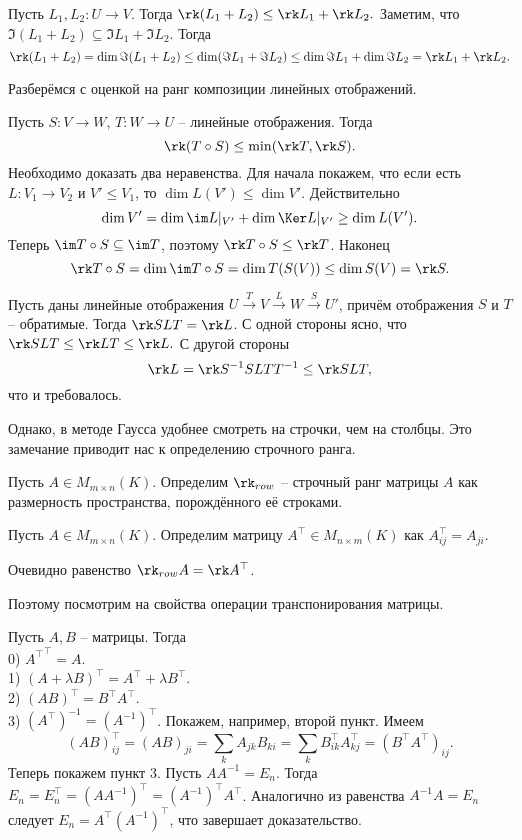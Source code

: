 \utv Пусть $L_1, L_2 \colon U \to V$. Тогда $\rk (L_1 + L_2) \leq \rk L_1 + \rk L_2.$
\eutv
\proof Заметим, что $\Im(L_1 + L_2) \subseteq \Im L_1 + \Im L_2$. Тогда 
$$\rk (L_1 + L_2) =\dim \Im(L_1 + L_2) \leq \dim(\Im L_1 + \Im L_2) \leq \dim\Im L_1 + \dim\Im L_2 = \rk L_1 + \rk L_2.$$
\endproof

Разберёмся с оценкой на ранг композиции линейных отображений.

\utv Пусть $S \colon V \to W$, $T \colon W \to U$ -- линейные отображения. Тогда
$$\rk (T \circ S) \leq \min(\rk T, \rk S).$$
\eutv 
Необходимо доказать два неравенства. Для начала покажем, что если есть $L\colon V_1 \to V_2$ и $V' \leq V_1$, то $\dim L(V') \leq \dim V'$. Действительно $$\dim V'= \dim \im L|_{V'} + \dim \Ker L|_{V'} \geq \dim L(V').$$
Теперь $\im T \circ S \subseteq  \im T$, поэтому $\rk T \circ S \leq \rk T$.
Наконец $$\rk T \circ S= \dim \im T \circ S = \dim T (S(V)) \leq \dim S(V)= \rk S.$$
\endproof


\crl Пусть даны линейные отображения $U \stackrel{T}{\to} V \stackrel{L}{\to} W \stackrel{S}{\to} U'$, причём отображения $S$ и $T$ -- обратимые. Тогда $\rk SLT=\rk L$.
\ecrl
\proof С одной стороны ясно, что $\rk SLT \leq \rk LT \leq \rk L.$ С другой стороны $$\rk L = \rk S^{-1}SLTT^{-1} \leq \rk SLT,$$ что и требовалось.
\endproof







Однако, в методе Гаусса удобнее смотреть на строчки, чем на столбцы. Это замечание приводит нас к определению строчного ранга.

\dfn Пусть $A\in M_{m\times n}(K)$. Определим $\rk_{row}$ -- строчный ранг матрицы $A$ как размерность пространства, порождённого её строками.
\edfn

\dfn Пусть  $A\in M_{m\times n}(K)$. Определим матрицу $A^{\top}\in M_{n\times m}(K)$ как $A^{\top}_{ij}=A_{ji}$.
\edfn

\rm Очевидно равенство $\rk_{row} A= \rk A^{\top}$.
\erm

Поэтому посмотрим на свойства операции транспонирования матрицы.

\lm Пусть $A,B$ -- матрицы. Тогда\\
0) ${A^{\top}}^{\top}=A$.\\
1) $(A+\lambda B)^{\top}= A^{\top}+\lambda B^{\top}$.\\
2) $(AB)^{\top}=B^{\top}A^{\top}$.\\
3) $(A^{\top})^{-1}= (A^{-1})^{\top}$.
\elm
\proof Покажем, например, второй пункт. Имеем
$$(AB)^{\top}_{ij}= (AB)_{ji}=\sum_k A_{jk}B_{ki}=\sum_k B^{\top}_{ik}A^{\top}_{kj}=(B^{\top}A^{\top})_{ij}.$$
Теперь покажем пункт 3. Пусть $AA^{-1}=E_n$. Тогда $E_n=E_n^{\top}=(AA^{-1})^{\top}= (A^{-1})^{\top}A^{\top}$. Аналогично из равенства $A^{-1}A=E_n$ следует $E_n=A^{\top}(A^{-1})^{\top}$, что завершает доказательство.
\endproof

